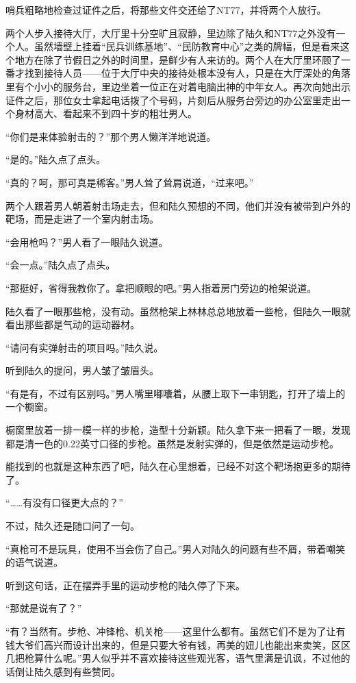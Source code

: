 哨兵粗略地检查过证件之后，将那些文件交还给了NT77，并将两个人放行。

两个人步入接待大厅，大厅里十分空旷且寂静，里边除了陆久和NT77之外没有一个人。虽然墙壁上挂着“民兵训练基地”、“民防教育中心”之类的牌幅，但是看来这个地方在除了节假日之外的时间里，是鲜少有人来访的。两个人在大厅里环顾了一番才找到接待人员——位于大厅中央的接待处根本没有人，只是在大厅深处的角落里有个小小的服务台，里边坐着一位正在对着电脑出神的中年女人。再次向她出示证件之后，那位女士拿起电话拨了个号码，片刻后从服务台旁边的办公室里走出一个身材高大、看起来不到四十岁的粗壮男人。

“你们是来体验射击的？”那个男人懒洋洋地说道。

“是的。”陆久点了点头。

“真的？呵，那可真是稀客。”男人耸了耸肩说道，“过来吧。”

两个人跟着男人朝着射击场走去，但和陆久预想的不同，他们并没有被带到户外的靶场，而是走进了一个室内射击场。

“会用枪吗？”男人看了一眼陆久说道。

“会一点。”陆久点了点头。

“那挺好，省得我教你了。拿把顺眼的吧。”男人指着房门旁边的枪架说道。

陆久看了一眼那些枪，没有动。虽然枪架上林林总总地放着一些枪，但陆久一眼就看出那些都是气动的运动器材。

“请问有实弹射击的项目吗。”陆久说。

听到陆久的提问，男人皱了皱眉头。

“有是有，不过有区别吗。”男人嘴里嘟囔着，从腰上取下一串钥匙，打开了墙上的一个橱窗。

橱窗里放着一排一模一样的步枪，造型十分新颖。陆久拿下来一把看了一眼，发现都是清一色的0.22英寸口径的步枪。虽然是发射实弹的，但是依然是运动步枪。

能找到的也就是这种东西了吧，陆久在心里想着，已经不对这个靶场抱更多的期待了。

“……有没有口径更大点的？”

不过，陆久还是随口问了一句。

“真枪可不是玩具，使用不当会伤了自己。”男人对陆久的问题有些不屑，带着嘲笑的语气说道。

听到这句话，正在摆弄手里的运动步枪的陆久停了下来。

“那就是说有了？”

“有？当然有。步枪、冲锋枪、机关枪——这里什么都有。虽然它们不是为了让有钱大爷们高兴而设计出来的，但是只要大爷有钱，再美的妞儿也能出来卖笑，区区几把枪算什么呢。”男人似乎并不喜欢接待这些观光客，语气里满是讥讽，不过他的话倒让陆久感到有些赞同。

